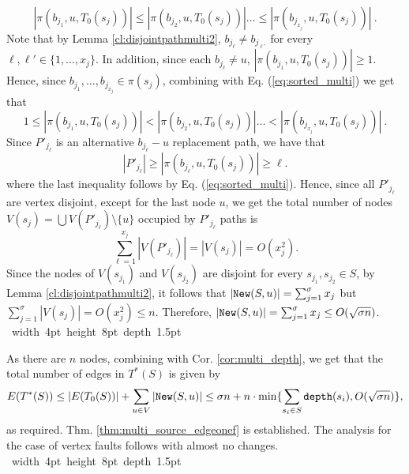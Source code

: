 \documentclass[12pt]{article}
\def\depth{\mbox{\tt depth}}
\def\blackslug{\hbox{\hskip 1pt \vrule width 4pt height 8pt
    depth 1.5pt \hskip 1pt}}
\def\QED{\quad\blackslug\lower 8.5pt\null\par}
\newcommand{\New}[0]{\mbox{\tt New}}
\def\NSource{\sigma}
\begin{document}
{\begin{equation}
\label{eq:sorted_multi}
|\pi(b_{j_1}, u,T_0(s_j))| \leq |\pi(b_{j_2}, u,T_0(s_j))| \ldots \leq |\pi(b_{j_{x_j}}, u, T_0(s_j))|~.
\end{equation}
Note that by Lemma \ref{cl:disjointpathmulti2}, $b_{j_\ell} \neq b_{j_{\ell'}}$ for every $\ell, \ell' \in \{1, \ldots, x_j\}$. In addition, since each $b_{j_\ell} \neq u$, $|\pi(b_{j_1}, u,T_0(s_j))|\geq 1$.
Hence, since $b_{j_1}, \ldots, b_{j_{x_j}} \in \pi(s_j)$, combining with Eq. (\ref{eq:sorted_multi}) we get that
\begin{equation}
\label{eq:sorted_multi2}
1\leq |\pi(b_{j_1}, u,T_0(s_j))| < |\pi(b_{j_2}, u,T_0(s_j))| \ldots < |\pi(b_{j_{x_j}}, u,T_0(s_j))|~.
\end{equation}
Since $P'_{j_\ell}$ is an alternative $b_{j_\ell}-u$ replacement path, we have that
\begin{equation}
\label{eq:sorted_multi_spath}
|P'_{j_\ell}|\geq |\pi(b_{j_\ell}, u,T_0(s_j))| \geq \ell.
\end{equation}
where the last inequality follows by Eq. (\ref{eq:sorted_multi}).
Hence, since all $P'_{j_\ell}$ are vertex disjoint, except for the last node $u$, we get the total number of nodes $V(s_j)=\bigcup V(P'_{j_{\ell}}) \setminus \{u\}$
occupied by $P'_{j_\ell}$ paths is
$$\sum_{\ell=1}^{x_{j}} |V(P'_{j_\ell})|= |V(s_{j})|=O(x_j^2).$$
Since the nodes of $V(s_{j_1})$ and $V(s_{j_2})$ are disjoint for every $s_{j_1}, s_{j_2} \in S$, by Lemma \ref{cl:disjointpathmulti2},
it follows that $|\New(S, u)|=\sum_{j=1}^{\NSource} x_j$ but $\sum_{j=1}^{\NSource} |V(s_j)|=O(x_j^2) \leq n$. Therefore, $|\New(S,u)|=\sum_{j=1}^\NSource x_j \leq O(\sqrt{\NSource n})$.
\QED
As there are $n$ nodes, combining with Cor. \ref{cor:multi_depth}, we get that the total number of edges in $T^*(S)$ is given by
$$E(T^*(S)) \leq |E(T_0(S))|+ \sum_{u \in V} |\New(S,u)| \leq \NSource n + n \cdot \min\{\sum_{s_i \in S} \depth(s_i),O(\sqrt{\NSource n})\},$$
as required. Thm. \ref{thm:multi_source_edgeonef} is established.
The analysis for the case of vertex faults follows with almost no changes.
\QED
}\APPENDUPPERMULTI
\end{document}

